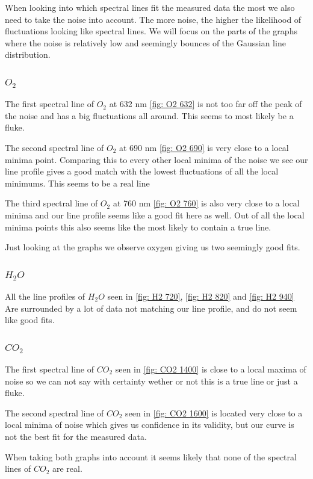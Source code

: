 \documentclass[reprint,english,notitlepage]{revtex4-2}
\begin{document}
When looking into which spectral lines fit the measured data the most we also need to take the noise into account. The more noise, the higher the likelihood of fluctuations looking like spectral lines. We will focus on the parts of the graphs where the noise is relatively low and seemingly bounces of the Gaussian line distribution. 
\subsubsection*{$ O_2 $}
The first spectral line of $O_2$ at 632 nm \ref{fig: O2 632} is not too far off the peak of the noise and has a big fluctuations all around. This seems to most likely be a fluke. 

The second spectral line of $O_2$ at 690 nm \ref{fig: O2 690} is very close to a local minima point. Comparing this to every other local minima of the noise we see our line profile gives a good match with the lowest fluctuations of all the local minimums. This seems to be a real line 

The third spectral line of $O_2$ at 760 nm \ref{fig: O2 760} is also very close to a local minima and our line profile seems like a good fit here as well. Out of all the local minima points this also seems like the most likely to contain a true line. 

Just looking at the graphs we observe oxygen giving us two seemingly good fits.  

\subsubsection*{$ H_2O $}
All the line profiles of $ H_2O $ seen in \ref{fig: H2 720}, \ref{fig: H2 820} and \ref{fig: H2 940} Are surrounded by a lot of data not matching our line profile, and do not seem like good fits. 

\subsubsection*{$ CO_2 $}
The first spectral line of $ CO_2 $ seen in \ref{fig: CO2 1400} is close to a local maxima of noise so we can not say with certainty wether or not this is a true line or just a fluke. 

The second spectral line of $ CO_2 $ seen in \ref{fig: CO2 1600} is located very close to a local minima of noise which gives us confidence in its validity, but our curve is not the best fit for the measured data. 

When taking both graphs into account it seems likely that none of the spectral lines of $ CO_2 $ are real. 
\end{document}

